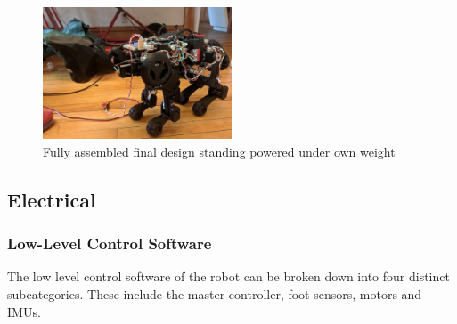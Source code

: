          \begin{figure}[H]
                \centering
                \includegraphics[width=0.5\textwidth]{figures/TestingFinalDesign.jpg}
                \caption{Fully assembled final design standing powered under own weight}
                \label{fig:TestingFinalDesign}
        \end{figure} 

\subsection{Electrical}
\subsubsection{Low-Level Control Software} 
    The low level control software of the robot can be broken down into four distinct subcategories. These include the master controller, foot sensors, motors and IMUs. 
